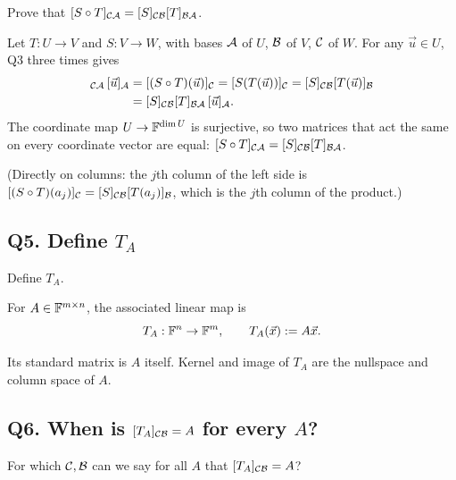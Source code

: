 \begin{promptbox}
Prove that $[S\circ T]_{\mathcal{C}\mathcal{A}}=[S]_{\mathcal{C}\mathcal{B}}[T]_{\mathcal{B}\mathcal{A}}$.
\end{promptbox}

\begin{coursebox}
Let $T:U\to V$ and $S:V\to W$, with bases $\mathcal{A}$ of $U$, $\mathcal{B}$ of $V$, $\mathcal{C}$ of $W$.
For any $\vec{u}\in U$, Q3 three times gives
\begin{align*}
[S\circ T]_{\cC\cA}\,[\vec{u}]_{\cA}
&=[(S\circ T)(\vec{u})]_{\cC}
=[S(T(\vec{u}))]_{\cC}
=[S]_{\cC\cB}[T(\vec{u})]_{\cB}\\
&=[S]_{\cC\cB}[T]_{\cB\cA}\,[\vec{u}]_{\cA}.
\end{align*}
The coordinate map $U\to\mathbb{F}^{\dim U}$ is surjective, so two matrices that act the
same on every coordinate vector are equal:
$[S\circ T]_{\mathcal{C}\mathcal{A}}=[S]_{\mathcal{C}\mathcal{B}}[T]_{\mathcal{B}\mathcal{A}}$.

(Directly on columns: the $j$th column of the left side is
$[(S\circ T)(a_j)]_{\mathcal{C}}=[S]_{\mathcal{C}\mathcal{B}}[T(a_j)]_{\mathcal{B}}$, which is the $j$th column
of the product.)
\end{coursebox}

\subsection{Q5. Define $T_A$}

\begin{promptbox}
Define $T_A$.
\end{promptbox}

\begin{coursebox}
\begin{definition*}
For $A\in\mathbb{F}^{m\times n}$, the associated linear map is
\[
T_A:\mathbb{F}^n\to\mathbb{F}^m,\qquad T_A(\vec{x}):=A\vec{x}.
\]
\end{definition*}
Its standard matrix is $A$ itself. Kernel and image of $T_A$ are the nullspace
and column space of $A$.
\end{coursebox}

\subsection{Q6. When is $[T_A]_{\mathcal{C}\mathcal{B}}=A$ for every $A$?}

\begin{promptbox}
For which $\mathcal{C},\mathcal{B}$ can we say for all $A$ that $[T_A]_{\mathcal{C}\mathcal{B}}=A$?
\end{promptbox}

